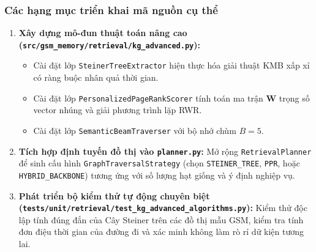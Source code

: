 \documentclass[a4paper,11pt]{article}
\begin{document}
\subsubsection{Các hạng mục triển khai mã nguồn cụ thể}
\begin{enumerate}[leftmargin=1.5em]
    \item \textbf{Xây dựng mô-đun thuật toán nâng cao (\nolinkurl{src/gsm_memory/retrieval/kg_advanced.py}):}
    \begin{itemize}[noitemsep]
        \item Cài đặt lớp \texttt{SteinerTreeExtractor} hiện thực hóa giải thuật KMB xấp xỉ có ràng buộc nhân quả thời gian.
        \item Cài đặt lớp \texttt{PersonalizedPageRankScorer} tính toán ma trận $\mathbf{W}$ trọng số vector nhúng và giải phương trình lặp RWR.
        \item Cài đặt lớp \texttt{SemanticBeamTraverser} với bộ nhớ chùm $B=5$.
    \end{itemize}
    \item \textbf{Tích hợp định tuyến đồ thị vào \nolinkurl{planner.py}:}
    Mở rộng \texttt{RetrievalPlanner} để sinh cấu hình \texttt{GraphTraversalStrategy} (chọn \texttt{STEINER\_TREE}, \texttt{PPR}, hoặc \texttt{HYBRID\_BACKBONE}) tương ứng với số lượng hạt giống và ý định nghiệp vụ.
    \item \textbf{Phát triển bộ kiểm thử tự động chuyên biệt (\nolinkurl{tests/unit/retrieval/test_kg_advanced_algorithms.py}):}
    Kiểm thử độc lập tính đúng đắn của Cây Steiner trên các đồ thị mẫu GSM, kiểm tra tính đơn điệu thời gian của đường đi và xác minh không làm rò rỉ dữ kiện tương lai.
\end{enumerate}
\end{document}
